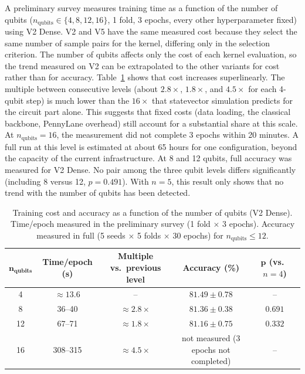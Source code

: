 A preliminary survey measures training time as a function of the number
of qubits ($n_{\text{qubits}} \in \{4, 8, 12, 16\}$, 1 fold, 3 epochs,
every other hyperparameter fixed) using V2 Dense. V2 and V5 have the same
measured cost because they select the same number of sample pairs for
the kernel, differing only in the selection criterion. The number of
qubits affects only the cost of each kernel evaluation, so the trend
measured on V2 can be extrapolated to the other variants for cost rather
than for accuracy. Table~\ref{tab:qubitcost} shows that cost increases
superlinearly. The multiple between consecutive levels (about
$2.8\times$, $1.8\times$, and $4.5\times$ for each 4-qubit step) is much
lower than the $16\times$ that statevector simulation predicts for the circuit part alone. This suggests that fixed costs (data loading, the
classical backbone, PennyLane overhead) still account for a substantial
share at this scale. At $n_{\text{qubits}}=16$, the measurement did not
complete 3 epochs within 20 minutes. A full run at this level is
estimated at about 65 hours for one configuration, beyond the capacity
of the current infrastructure. At 8 and 12 qubits, full accuracy was
measured for V2 Dense. No pair among the three qubit levels differs
significantly (including 8 versus 12, $p=0.491$). With $n=5$, this result
only shows that no trend with the number of qubits has been detected.

\begin{table}[!htbp]
\centering
\caption{Training cost and accuracy as a function of the number of
qubits (V2 Dense). Time/epoch measured in the preliminary survey (1
fold $\times$ 3 epochs). Accuracy measured in full (5 seeds $\times$
5 folds $\times$ 30 epochs) for $n_{\text{qubits}} \le 12$.}
\label{tab:qubitcost}
\footnotesize
\begin{tabular}{ccccc}
\toprule
$\boldsymbol{n_{\text{qubits}}}$ & \textbf{Time/epoch (s)} & \textbf{Multiple vs.\ previous level} & \textbf{Accuracy (\%)} & $\boldsymbol{p}$ \textbf{(vs.\ $n=4$)} \\
\midrule
4  & $\approx 13.6$ & -- & $81.49 \pm 0.78$ & -- \\
8  & 36--40 & $\approx 2.8\times$ & $81.36 \pm 0.38$ & $0.691$ \\
12 & 67--71 & $\approx 1.8\times$ & $81.16 \pm 0.75$ & $0.332$ \\
16 & 308--315 & $\approx 4.5\times$ & not measured (3 epochs not completed) & -- \\
\bottomrule
\end{tabular}
\end{table}
\FloatBarrier

